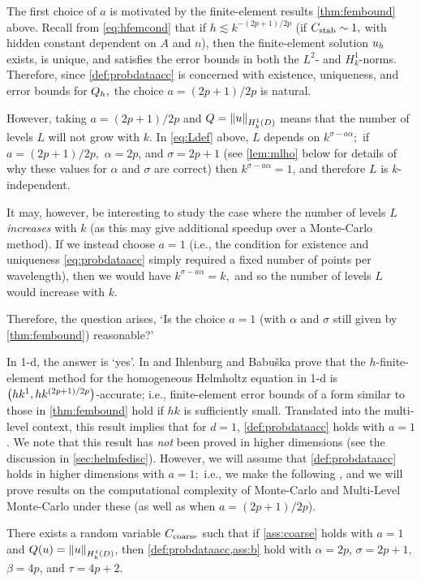 The first choice of $a$ is motivated by the finite-element results \cref{thm:fembound} above. Recall from \cref{eq:hfemcond} that if $h \lesssim k^{-(2p+1)/2p}$ (if $C_{\mathrm{stab}} \sim 1,$ with hidden constant dependent on $A$ and $n$), then the finite-element solution $u_{h}$ exists, is unique, and satisfies the error bounds in both the $L^2$- and $H^1_k$-norms. Therefore, since \cref{def:probdataacc} is concerned with existence, uniqueness, and error bounds for $Q_{h},$ the choice $a=(2p+1)/2p$ is natural.

However, taking $a=(2p+1)/2p$ and $Q = \NHokD{u}$ means that the number of levels $L$ will not grow with $k.$ In \cref{eq:Ldef} above, $L$ depends on $k^{\sigma-a\alpha};$ if $a=(2p+1)/2p,$ $\alpha = 2p$, and $\sigma = 2p+1$ (see \cref{lem:mlho} below for details of why these values for $\alpha$ and $\sigma$ are correct) then $k^{\sigma-a\alpha} = 1$, and therefore $L$ is $k$-independent.

It may, however, be interesting to study the case where the number of levels $L$ \emph{increases} with $k$ (as this may give additional speedup over a Monte-Carlo method). If we instead choose $a=1$ (i.e., the condition for existence and uniqueness \cref{eq:probdataacc} simply required a fixed number of points per wavelength), then we would have $k^{\sigma - a\alpha} = k,$ and so the number of levels $L$ would increase with $k.$ 

Therefore, the question arises, `Is the choice $a=1$ (with $\alpha$ and $\sigma$ still given by \cref{thm:fembound}) reasonable?'

In 1-d, the answer is `yes'. In \cite[Corollary 3.2]{IhBa:97} and \cite[Theorem 4.27 and equation 4.7.41]{Ih:98} Ihlenburg and Babu\v{s}ka prove that the $h$-finite-element method for the homogeneous Helmholtz equation in 1-d is $\hk{1}{(2p+1)/2p}$-accurate; i.e., finite-element error bounds of a form similar to those in \cref{thm:fembound} hold if $hk$ is sufficiently small. Translated into the multi-level context, this result implies that for $d=1$, \cref{def:probdataacc} holds with $a=1$. We note that this result has \emph{not} been proved in higher dimensions (see the discussion in \cref{sec:helmfedisc}). However, we will assume that \cref{def:probdataacc} holds in higher dimensions with $a=1;$ i.e., we make the following , and we will prove results on the computational complexity of Monte-Carlo and Multi-Level Monte-Carlo under these  (as well as when $a=(2p+1)/2p$).

\bas[Assumptions for $Q(u) = \NHokD{u}$ with $a=1$]\label{ass:mlho}
There exists a random variable $C_{\mathrm{coarse}}$ such that if \cref{ass:coarse} holds with $a = 1$ and $Q(u) = \NHokD{u}$, then \cref{def:probdataacc,ass:b} hold with $\alpha = 2p$, $\sigma = 2p+1,$ $\beta = 4p$, and $\tau = 4p+2$.
\eas

